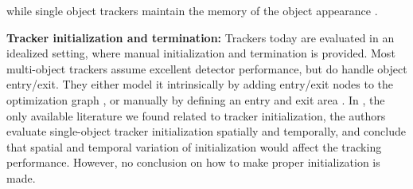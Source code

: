 while single object trackers maintain the memory of the object appearance \cite{kalal2012tracking}.

\textbf{Tracker initialization and termination:}
Trackers today are evaluated in an idealized setting, where manual initialization and termination is provided.
Most multi-object trackers assume excellent detector performance, but do handle object entry/exit. They either model it intrinsically by adding entry/exit nodes to the optimization graph
\cite{zhang2008global}, 
or manually by defining an entry and exit area
\cite{andriyenko2011multi}.
In \cite{Wu_2013_CVPR}, 
the only available literature we found related to tracker initialization, 
the authors evaluate single-object tracker initialization spatially and temporally, and conclude that spatial and temporal variation of initialization would affect the tracking performance. However, no conclusion on how to make proper initialization is made.

